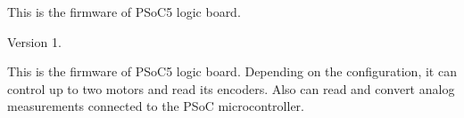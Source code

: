 This is the firmware of PSo\+C5 logic board. \begin{DoxyVersion}{Version}
1.
\end{DoxyVersion}
This is the firmware of PSo\+C5 logic board. Depending on the configuration, it can control up to two motors and read its encoders. Also can read and convert analog measurements connected to the PSoC microcontroller. ~\newline
 